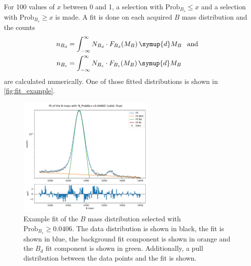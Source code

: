 For 100 values of $x$ between 0 and 1, a selection with $\text{Prob}_{B_s} \leq x$ and a selection with $\text{Prob}_{B_s} \geq x$ is made.
A fit is done on each acquired $B$ mass distribution and the counts
\begin{align*}
    n_{B_d} &= \int_{-\infty}^{\infty} N_{B_d} \cdot F_{B_d}(M_B) \, \symup{d}M_B \:\:\text{ and} \\
    n_{B_s} &= \int_{-\infty}^{\infty} N_{B_s} \cdot F_{B_s}(M_B) \, \symup{d}M_B
\end{align*}
are calculated numerically.
One of those fitted distributions is shown in \autoref{fig:fit_example}.

\begin{figure}
    \centering
    \includegraphics[width=0.6\textwidth]{images/fit_example.pdf}
    \caption{Example fit of the $B$ mass distribution selected with $\text{Prob}_{B_s} \geq 0.0406$. The data distribution is shown in black, the fit is shown in blue, the background fit component is shown in orange and the $B_d$ fit component is shown in green. Additionally, a pull distribution between the data points and the fit is shown.}
    \label{fig:fit_example}
\end{figure}

